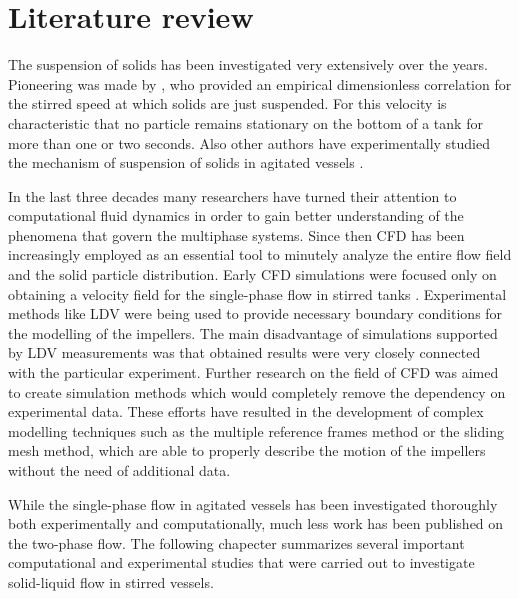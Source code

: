 \chapter{Literature review}
The suspension of solids has been investigated very extensively over the years. Pioneering was made by \citet{zwi58}, who provided an empirical dimensionless correlation for the  stirred speed at which solids are just suspended. For this velocity is characteristic that no particle remains stationary on the bottom of a tank for more than one or two seconds. Also other authors have experimentally studied the mechanism of suspension of solids in agitated vessels \citep{nie68,bal78,arm98}.   

In the last three decades many researchers have turned their attention to computational fluid dynamics in order to gain better understanding of the phenomena that govern the multiphase systems. Since then CFD has been increasingly employed as an essential tool to minutely analyze the entire flow field and the solid particle distribution. Early CFD simulations were focused only on obtaining a velocity field for the single-phase flow in stirred tanks \citep{kre91}. Experimental methods like LDV  were being used to provide necessary boundary conditions for the modelling of the impellers. The main disadvantage of simulations supported by LDV measurements was that obtained results were very closely connected with the particular experiment. Further research on the field of CFD was aimed to create simulation methods which would completely remove the dependency on experimental data. These efforts have resulted in the development of complex modelling techniques such as the multiple reference frames method or the sliding mesh method, which are able to properly describe the motion of the impellers without the need of additional data.  

While the single-phase flow in agitated vessels has been investigated thoroughly both experimentally and computationally, much less work has been published on the two-phase flow. The following chapecter summarizes several important computational and experimental studies that were carried out to investigate solid-liquid flow in stirred vessels.  
  

